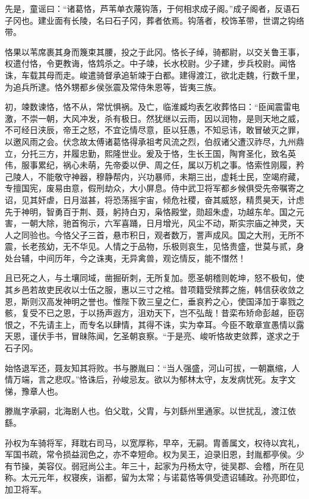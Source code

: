 \documentclass[12pt,UTF8]{ctexbook}
\begin{document}
先是，童谣曰：“诸葛恪，芦苇单衣蔑钩落，于何相求成子阁。”成子阁者，反语石子冈也。建业面有长陵，名曰石子冈，葬者依焉。钩落者，校饰革带，世谓之钩络带。

恪果以苇席裹其身而篾束其腰，投之于此冈。恪长子绰，骑都尉，以交关鲁王事，权遣付恪，令更教诲，恪鸩杀之。中子竦，长水校尉。少子建，步兵校尉。闻恪诛，车载其母而走。峻遣骑督承追斩竦于白都。建得渡江，欲北走魏，行数千里，为追兵所逮。恪外甥都乡侯张震及常侍朱恩等，皆夷三族。

初，竦数谏恪，恪不从，常忧惧祸。及亡，临淮臧均表乞收葬恪曰：“臣闻震雷电激，不崇一朝，大风冲发，杀有极日。然犹继以云雨，因以润物，是则天地之威，不可经日浃辰，帝王之怒，不宜讫情尽意，臣以狂愚，不知忌讳，敢冒破灭之罪，以邀风雨之会。伏念故太傅诸葛恪得承祖考风流之烈，伯叔诸父遭汉祚尽，九州鼎立，分托三方，并履忠勤，熙隆世业。爰及于恪，生长王国，陶育圣化，致名英伟，服事累纪，祸心未萌，先帝委以伊、周之任，属以万机之事。恪索性刚履，矜己陵人，不能敬守神器，穆静帮内，兴功暴师，未期三出，虚耗士民，空竭府藏，专擅国宪，废易由意，假刑劫众，大小屏息。侍中武卫将军都乡候俱受先帝嘱寄之诏，见其奸虐，日月滋甚，将恐荡摇宇宙，倾危社稷，奋其威怒，精贯昊天，计虑先于神明，智勇百于荆、聂，躬持白刃，枭恪殿堂，勋超朱虚，功越东牟。国之元害，一朝大除，驰首徇示，六军喜踊，日月增光，风尘不动，斯实宗庙之神灵，天人之同验也。今恪父子三首，悬市积日，观者数万，詈声成风。国之大刑，无所不震，长老孩幼，无不华见。人情之于品物，乐极则哀生，见恪贵盛，世莫与贰，身处台辅，中间历年，今之诛夷，无异禽兽，观讫情反，能不憯然！

且已死之人，与土壤同域，凿掘斫刺，无所复加。愿圣朝稽则乾坤，怒不极旬，使其乡邑若故吏民收以士伍之服，惠以三寸之棺。昔项籍受殡葬之施，韩信获收敛之恩，斯则汉高发神明之誉也。惟陛下敦三皇之仁，垂哀矜之心，使国泽加于辜戮之骸，复受不已之恩，于以扬声遐方，沮劝天下，岂不弘哉！昔栾布矫命彭越，臣窃恨之，不先请主上，而专名以肆情，其得不诛，实为幸耳。今臣不敢章宣愚情以露天恩，谨伏手书，冒昧陈闻，乞圣朝哀察。“于是亮、峻听恪故吏敛葬，遂求之于石子冈。

始恪退军还，聂友知其将败。书与滕胤曰：“当人强盛，河山可拔，一朝羸缩，人情万端，言之悲叹。”恪诛后，孙峻忌友。欲以为郁林太守，友发病忧死。友字文悌，豫章人也。

滕胤字承嗣，北海剧人也。伯父耽，父胄，与刘繇州里通家。以世扰乱，渡江依繇。

孙权为车骑将军，拜耽右司马，以宽厚称，早卒，无嗣。胄善属文，权待以宾礼，军国书疏，常令损益润色之，亦不幸短命。权为吴王，迫录旧恩，封胤都亭侯。少有节操，美容仪。弱冠尚公主。年三十，起家为丹杨太守，徙吴郡、会稽，所在见称。太元元年，权寝疾，诣都，留为太常；与诺葛恪等俱受遗诏辅政。孙亮即位，加卫将军。
\end{document}

